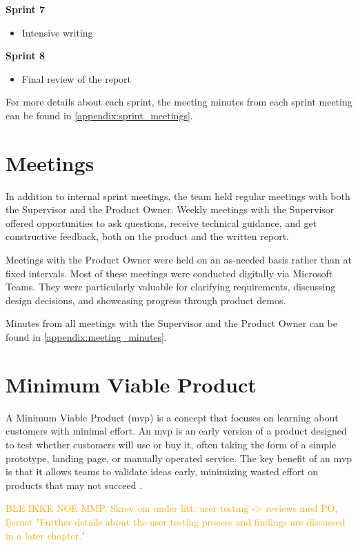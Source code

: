 \textbf{Sprint 7}
\begin{itemize}
    \item Intensive writing
\end{itemize}


\textbf{Sprint 8}
\begin{itemize}
    \item Final review of the report
\end{itemize}

For more details about each sprint, the meeting minutes from each sprint meeting can be found in \autoref{appendix:sprint_meetings}.

\section{Meetings}

In addition to internal sprint meetings, the team held regular meetings with both the Supervisor and the Product Owner. Weekly meetings with the Supervisor offered opportunities to ask questions, receive technical guidance, and get constructive feedback, both on the product and the written report.

Meetings with the Product Owner were held on an as-needed basis rather than at fixed intervals. Most of these meetings were conducted digitally via Microsoft Teams. They were particularly valuable for clarifying requirements, discussing design decisions, and showcasing progress through product demos.

Minutes from all meetings with the Supervisor and the Product Owner can be found in \autoref{appendix:meeting_minutes}.

\section{Minimum Viable Product}

A Minimum Viable Product (\acrshort{mvp}) is a concept that focuses on learning about customers with minimal effort. An \acrshort{mvp} is an early version of a product designed to test whether customers will use or buy it, often taking the form of a simple prototype, landing page, or manually operated service. The key benefit of an \acrshort{mvp} is that it allows teams to validate ideas early, minimizing wasted effort on products that may not succeed \cite{agile_alliance_mvp}. 

\textcolor{orange}{BLE IKKE NOE MMP. Skrev om under litt: user testing -> reviews med PO, fjernet "Further details about the user testing process and findings are discussed in a later chapter."}

